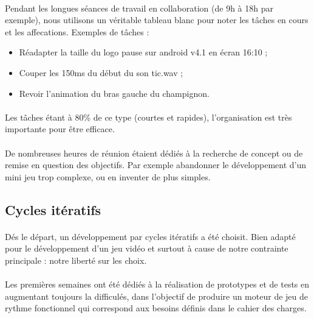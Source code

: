 \paragraph{}
Pendant les longues séances de travail en collaboration (de 9h à 18h par exemple), nous utilisons un véritable tableau blanc pour noter les tâches en cours et les affecations. Exemples de tâches :

\begin{itemize}
\item Réadapter la taille du logo pause sur android v4.1 en écran 16:10 ;
\item Couper les 150ms du début du son tic.wav ;
\item Revoir l’animation du bras gauche du champignon.
\end{itemize}

\paragraph{}
Les tâches étant à 80\% de ce type (courtes et rapides), l’organisation est très importante pour être efficace.

\paragraph{}
De nombreuses heures de réunion étaient dédiés à la recherche de concept ou de remise en question des objectifs. Par exemple abandonner le développement d’un mini jeu trop complexe, ou en inventer de plus simples.

\subsection{Cycles itératifs}

\paragraph{}
Dés le départ, un développement par cycles itératifs a été choisit. Bien adapté pour le développement d’un jeu vidéo et surtout à cause de notre contrainte principale : notre liberté sur les choix.

\paragraph{}
Les premières semaines ont été dédiés à la réalisation de prototypes et de tests en augmentant toujours la difficulés, dans l’objectif de produire un moteur de jeu de rythme fonctionnel qui correspond aux besoins définis dans le cahier des charges.

